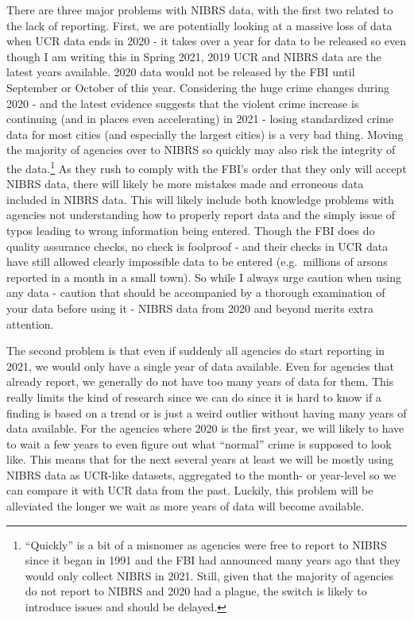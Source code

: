 \documentclass[
]{krantz}
\begin{document}
There are three major problems with NIBRS data, with the
first two related to the lack of reporting. First, we are
potentially looking at a massive loss of data when UCR data
ends in 2020 - it takes over a year for data to be released
so even though I am writing this in Spring 2021, 2019 UCR
and NIBRS data are the latest years available. 2020 data
would not be released by the FBI until September or October
of this year. Considering the huge crime changes during 2020
- and the latest evidence suggests that the violent crime
increase is continuing (and in places even accelerating) in
2021 - losing standardized crime data for most cities (and
especially the largest cities) is a very bad thing. Moving
the majority of agencies over to NIBRS so quickly may also
risk the integrity of the data.\footnote{``Quickly'' is a
  bit of a misnomer as agencies were free to report to NIBRS
  since it began in 1991 and the FBI had announced many
  years ago that they would only collect NIBRS in 2021.
  Still, given that the majority of agencies do not report
  to NIBRS and 2020 had a plague, the switch is likely to
  introduce issues and should be delayed.} As they rush to
comply with the FBI's order that they only will accept NIBRS
data, there will likely be more mistakes made and erroneous
data included in NIBRS data. This will likely include both
knowledge problems with agencies not understanding how to
properly report data and the simply issue of typos leading
to wrong information being entered. Though the FBI does do
quality assurance checks, no check is foolproof - and their
checks in UCR data have still allowed clearly impossible
data to be entered (e.g.~millions of arsons reported in a
month in a small town). So while I always urge caution when
using any data - caution that should be accompanied by a
thorough examination of your data before using it - NIBRS
data from 2020 and beyond merits extra attention.

The second problem is that even if suddenly all agencies do
start reporting in 2021, we would only have a single year of
data available. Even for agencies that already report, we
generally do not have too many years of data for them. This
really limits the kind of research since we can do since it
is hard to know if a finding is based on a trend or is just
a weird outlier without having many years of data available.
For the agencies where 2020 is the first year, we will
likely to have to wait a few years to even figure out what
``normal'' crime is supposed to look like. This means that
for the next several years at least we will be mostly using
NIBRS data as UCR-like datasets, aggregated to the month- or
year-level so we can compare it with UCR data from the past.
Luckily, this problem will be alleviated the longer we wait
as more years of data will become available.
\end{document}
